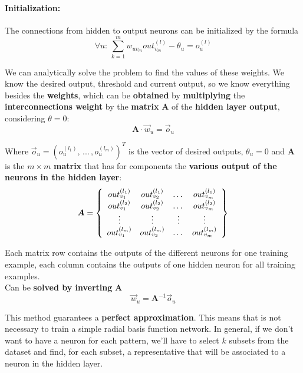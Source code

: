 \documentclass[11pt]{article}
\begin{document}
		\newpage
		
		\paragraph{Initialization:} The connections from hidden to output neurons can be initialized by the formula
		$$ \forall u: \, \sum_{k=1}^m w_{uv_m} out_{v_m}^{(l)} - \theta_u = o_u^{(l)} $$
		
		We can analytically solve the problem to find the values of these weights. We know the desired output, threshold and current output, so we know everything besides the \textbf{weights}, which can be \textbf{obtained} by \textbf{multiplying} the \textbf{interconnections weight} by the \textbf{matrix} $\bm{A}$ of the \textbf{hidden layer output}, considering $\theta = 0$:
		$$ \bm{A} \cdot \vec{w}_u = \vec{o}_u $$
		
		Where $\vec{o}_u = \left(o_u^{(l_1)}, \, ... \, , o_u^{(l_m)}\right)^T$ is the vector of desired outputs, $\theta_u = 0$ and $\bm{A}$ is the $m \times m$ \textbf{matrix} that has for components the \textbf{various output of the neurons in the hidden layer}:
		$$ \bm{A} = \left\{
		\begin{array}{c c c c}
			out_{v_1}^{(l_1)} & out_{v_2}^{(l_1)} & \dots & out_{v_m}^{(l_1)} \\
			out_{v_1}^{(l_2)} & out_{v_2}^{(l_2)} & \dots & out_{v_m}^{(l_2)} \\
			\vdots & \vdots & \vdots & \vdots \\
			out_{v_1}^{(l_m)} & out_{v_2}^{(l_m)} & \dots & out_{v_m}^{(l_m)} \\
		\end{array}
		\right\}$$
		
		Each matrix row contains the outputs of the different neurons for one training example, each column contains the outputs of one hidden neuron for all training examples.\\
		
		Can be \textbf{solved by inverting} $\bm{A}$
		$$ \vec{w}_u = \bm{A}^{-1} \vec{o}_u $$
		
		This method guarantees a \textbf{perfect approximation}. This means that is not necessary to train a simple radial basis function network. In general, if we don't want to have a neuron for each pattern, we'll have to select $k$ subsets from the dataset and find, for each subset, a representative that will be associated to a neuron in the hidden layer. \\
		
\end{document}
